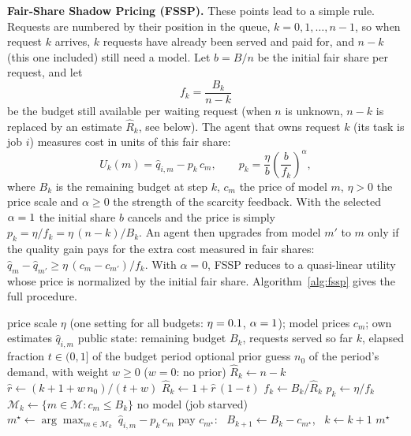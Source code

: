 \documentclass{article}
\begin{document}
\textbf{Fair-Share Shadow Pricing (FSSP).} These points lead to a simple rule. Requests are numbered by their position in the queue, $k = 0, 1, \dots, n-1$, so when request $k$ arrives, $k$ requests have already been served and paid for, and $n-k$ (this one included) still need a model. Let $b = B/n$ be the initial fair share per request, and let
\begin{equation}
f_k = \frac{B_k}{n-k}
\end{equation}
be the budget still available per waiting request (when $n$ is unknown, $n-k$ is replaced by an estimate $\hat R_k$, see below). The agent that owns request $k$ (its task is job $i$) measures cost in units of this fair share:
\begin{equation}
U_k(m) = \hat q_{i,m} - p_k\,c_m, \qquad p_k = \frac{\eta}{b}\left(\frac{b}{f_k}\right)^{\alpha},
\label{eq:fssp}
\end{equation}
where $B_k$ is the remaining budget at step $k$, $c_m$ the price of model $m$, $\eta>0$ the price scale and $\alpha\ge0$ the strength of the scarcity feedback. With the selected $\alpha=1$ the initial share $b$ cancels and the price is simply $p_k = \eta/f_k = \eta\,(n-k)/B_k$. An agent then upgrades from model $m'$ to $m$ only if the quality gain pays for the extra cost measured in fair shares: $\hat q_m - \hat q_{m'} \ge \eta\,(c_m - c_{m'})/f_k$. With $\alpha=0$, FSSP reduces to a quasi-linear utility whose price is normalized by the initial fair share. Algorithm~\ref{alg:fssp} gives the full procedure.

\begin{algorithm}[t]
\caption{Fair-Share Shadow Pricing (FSSP), run independently by each arriving agent}
\label{alg:fssp}
\begin{algorithmic}[1]
\Require price scale $\eta$ (one setting for all budgets: $\eta=0.1$, $\alpha=1$); model prices $c_m$; own estimates $\hat q_{i,m}$
\Require public state: remaining budget $B_k$, requests served so far $k$, elapsed fraction $t\in(0,1]$ of the budget period
\Require optional prior guess $n_0$ of the period's demand, with weight $w\ge0$ ($w=0$: no prior)
 \State $\hat R_k \gets n-k$ 
\Else
  \State $\hat r \gets (k+1+w\,n_0)/(t+w)$ 
  \State $\hat R_k \gets 1+\hat r\,(1-t)$ 
\EndIf
\State $f_k \gets B_k/\hat R_k$ 
\State $p_k \gets \eta/f_k$ 
\State $\mathcal{M}_k \gets \{m \in \mathcal{M} : c_m \le B_k\}$ 
 \State \Return no model (job starved) \EndIf
\State $m^\star \gets \arg\max_{m\in\mathcal{M}_k}\ \hat q_{i,m} - p_k\,c_m$ 
\State pay $c_{m^\star}$: \ $B_{k+1} \gets B_k - c_{m^\star}$, \ $k \gets k+1$
\State \Return $m^\star$
\end{algorithmic}
\end{algorithm}
\end{document}
